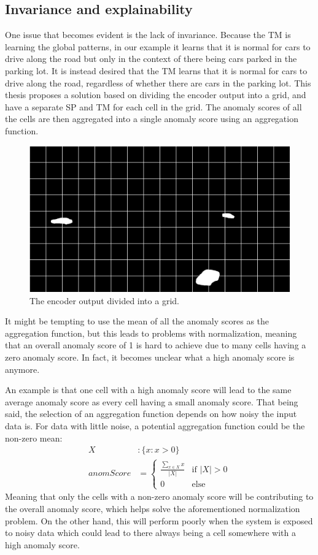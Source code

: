 \subsection{Invariance and explainability}
One issue that becomes evident is the lack of invariance. Because the TM is learning the global patterns, in our example it learns that it is normal for cars to drive along the road but only in the context of there being cars parked in the parking lot. It is instead desired that the TM learns that it is normal for cars to drive along the road, regardless of whether there are cars in the parking lot. This thesis proposes a solution based on dividing the encoder output into a grid, and have a separate SP and TM for each cell in the grid. The anomaly scores of all the cells are then aggregated into a single anomaly score using an aggregation function.
\begin{figure}[H]
    \centering
    \includegraphics[width=\textwidth]{resources/methodology/car_segmentation_grid.png}
    \caption{The encoder output divided into a grid.}
    \label{fig:grid}
\end{figure}
It might be tempting to use the mean of all the anomaly scores as the aggregation function, but this leads to problems with normalization, meaning that an overall anomaly score of 1 is hard to achieve due to many cells having a zero anomaly score. In fact, it becomes unclear what a high anomaly score is anymore.
\par
An example is that one cell with a high anomaly score will lead to the same average anomaly score as every cell having a small anomaly score. That being said, the selection of an aggregation function depends on how noisy the input data is. For data with little noise, a potential aggregation function could be the non-zero mean:
\begin{align*}
    X         & :\{x : x > 0\} \\
    anomScore & =
    \begin{cases}
        \frac{\sum_{x \in X}x}{|X|} & \text{if } |X| > 0 \\
        0                           & \text{else}
    \end{cases}
\end{align*}
Meaning that only the cells with a non-zero anomaly score will be contributing to the overall anomaly score, which helps solve the aforementioned normalization problem. On the other hand, this will perform poorly when the system is exposed to noisy data which could lead to there always being a cell somewhere with a high anomaly score.

